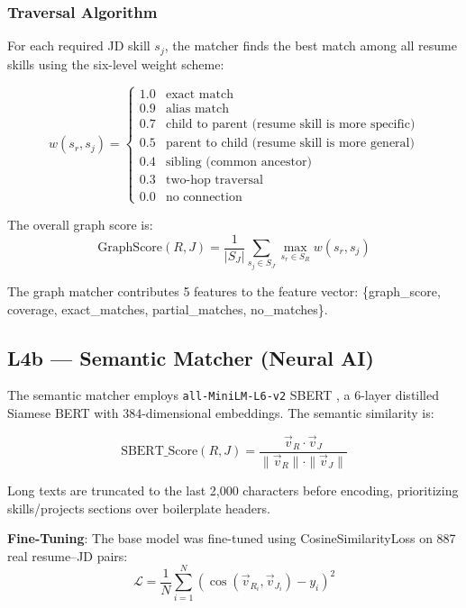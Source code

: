 \documentclass[12pt,a4paper]{report}
\begin{document}
\subsubsection{Traversal Algorithm}

For each required JD skill $s_j$, the matcher finds the best match among all resume skills using the six-level weight scheme:

\begin{equation}
w(s_r, s_j) = \begin{cases}
1.0 & \text{exact match} \\
0.9 & \text{alias match} \\
0.7 & \text{child to parent (resume skill is more specific)} \\
0.5 & \text{parent to child (resume skill is more general)} \\
0.4 & \text{sibling (common ancestor)} \\
0.3 & \text{two-hop traversal} \\
0.0 & \text{no connection}
\end{cases}
\end{equation}

The overall graph score is:
\begin{equation}
\text{GraphScore}(R, J) = \frac{1}{|S_J|} \sum_{s_j \in S_J} \max_{s_r \in S_R} w(s_r, s_j)
\end{equation}

The graph matcher contributes 5 features to the feature vector: \{graph\_score, coverage, exact\_matches, partial\_matches, no\_matches\}.

\subsection{L4b --- Semantic Matcher (Neural AI)}

The semantic matcher employs \texttt{all-MiniLM-L6-v2} SBERT \cite{reimers2019}, a 6-layer distilled Siamese BERT with 384-dimensional embeddings. The semantic similarity is:

\begin{equation}
\text{SBERT\_Score}(R, J) = \frac{\vec{v}_R \cdot \vec{v}_J}{\|\vec{v}_R\| \cdot \|\vec{v}_J\|}
\end{equation}

Long texts are truncated to the last 2,000 characters before encoding, prioritizing skills/projects sections over boilerplate headers.

\textbf{Fine-Tuning}: The base model was fine-tuned using CosineSimilarityLoss on 887 real resume--JD pairs:
\begin{equation}
\mathcal{L} = \frac{1}{N} \sum_{i=1}^{N} \left( \cos(\vec{v}_{R_i}, \vec{v}_{J_i}) - y_i \right)^2
\end{equation}
\end{document}

